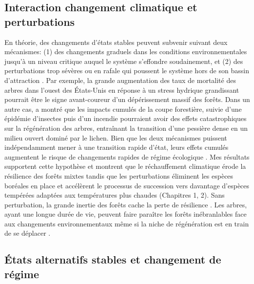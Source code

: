 \hypertarget{interaction-changement-climatique-et-perturbations}{%
\subsection{Interaction changement climatique et
perturbations}\label{interaction-changement-climatique-et-perturbations}}

En théorie, des changements d'états stables peuvent subvenir suivant
deux mécanismes: (1) des changements graduels dans les conditions
environnementales jusqu'à un niveau critique auquel le système
s'effondre soudainement, et (2) des perturbations trop sévères ou en
rafale qui poussent le système hors de son bassin d'attraction
\citep{scheffer_catastrophic_2001}. Par exemple, la grande augmentation
des taux de mortalité des arbres dans l'ouest des États-Unis en réponse
à un stress hydrique grandissant \citep{van_mantgem_apparent_2007}
pourrait être le signe avant-coureur d'un dépérissement massif des
forêts. Dans un autre cas, \citet{payette_shift_2003} a montré que les
impacts cumulés de la coupe forestière, suivie d'une épidémie d'insectes
puis d'un incendie pourraient avoir des effets catastrophiques sur la
régénération des arbres, entraînant la transition d'une pessière dense
en un milieu ouvert dominé par le lichen. Bien que les deux mécanismes
puissent indépendamment mener à une transition rapide d'état, leurs
effets cumulés augmentent le risque de changements rapides de régime
écologique \citep[\emph{regime
shift};][]{scheffer_catastrophic_2001, harris_biological_2018}. Mes
résultats supportent cette hypothèse et montrent que le réchauffement
climatique érode la résilience des forêts mixtes tandis que les
perturbations éliminent les espèces boréales en place et accélèrent le
processus de succession vers davantage d'espèces tempérées adaptées aux
températures plus chaudes (Chapitres 1, 2). Sans perturbation, la grande
inertie des forêts cache la perte de résilience
\citep{johnstone_changing_2016}. Les arbres, ayant une longue durée de
vie, peuvent faire paraître les forêts inébranlables face aux
changements environnementaux même si la niche de régénération est en
train de se déplacer \citep[Chapitre
3;][]{sittaro_tree_2017, boisvertmarsh_divergent_2019}.

\hypertarget{uxe9tats-alternatifs-stables-et-changement-de-ruxe9gime}{%
\subsection{États alternatifs stables et changement de
régime}\label{uxe9tats-alternatifs-stables-et-changement-de-ruxe9gime}}

